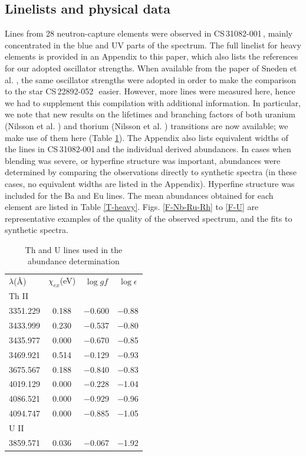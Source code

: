 \documentclass{aa}
\def\cs{CS\,31082-001\,}
\def\sned{CS\,22892-052\,}
\begin{document}
\subsection{Linelists and physical data}

Lines from 28 neutron-capture elements were observed in
\cs, mainly concentrated in the blue and UV parts of the spectrum. 
The full linelist for heavy elements is provided in an Appendix to this
paper, which also lists the references for our adopted oscillator strengths.
When available from the paper of Sneden et al. \cite{sneden96}, the same
oscillator strengths were adopted in order to make the comparison to the star
\sned\, easier. However, more lines were measured here, hence we had to
supplement this compilation with additional information. 
In particular, we note that new results on the
lifetimes and branching factors of both uranium (Nilsson et al.
\cite{nilsson01a}) and thorium (Nilsson et al. \cite{nilsson01b}) transitions
are now available; we make use of them here (Table \ref{T-Th}). The
Appendix also lists equivalent widths of the lines in \cs and the individual
derived abundances. In cases when blending was severe, or hyperfine structure
was important, abundances were determined by comparing the observations
directly to synthetic spectra (in these cases, no equivalent widths are listed
in the Appendix). Hyperfine structure was included for the Ba and Eu lines.  
The mean abundances obtained for each element are listed in Table
\ref{T-heavy}.  Figs. \ref{F-Nb-Ru-Rh} to \ref{F-U} are representative
examples of the quality of the observed spectrum, and the fits to synthetic
spectra. 

\begin{table}[htbp]
\caption{Th and U lines used in the abundance determination}\label{T-Th}
\begin{center}
\begin{tabular}{lccc}
\hline
$\lambda$(\AA) & $\chi_{ex}$(eV) & $\log gf$ & $\log \epsilon$\\
Th II \\
3351.229 &  0.188 & $-$0.600 &     $-$0.88 \\
3433.999 &  0.230 & $-$0.537 &     $-$0.80 \\
3435.977 &  0.000 & $-$0.670 &     $-$0.85 \\
3469.921 &  0.514 & $-$0.129 &     $-$0.93 \\
3675.567 &  0.188 & $-$0.840 &     $-$0.83 \\
4019.129 &  0.000 & $-$0.228 &     $-$1.04 \\
4086.521 &  0.000 & $-$0.929 &     $-$0.96 \\
4094.747 &  0.000 & $-$0.885 &     $-$1.05 \\
U II \\
3859.571 &  0.036 & $-$0.067 &     $-$1.92 \\
\hline\hline
\end{tabular}
\end{center}
\end{table}
\end{document}
